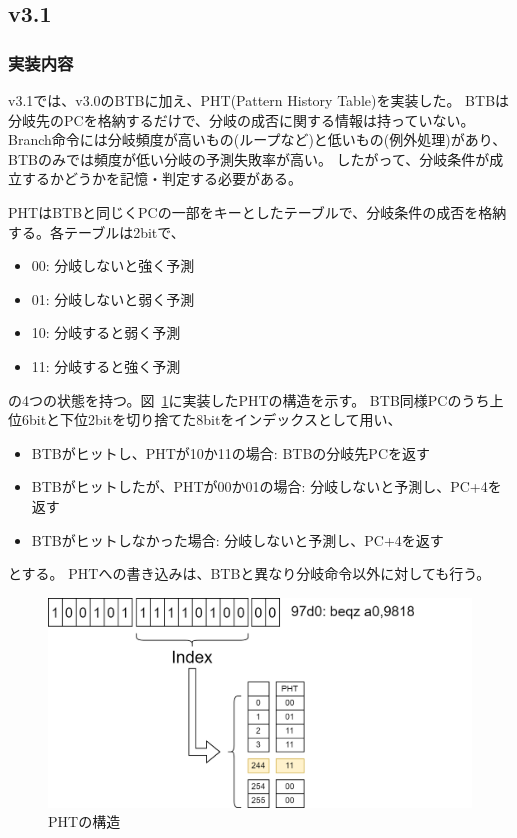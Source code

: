 \documentclass[dvipdfmx,10pt,a4paper,titlepage]{jsarticle}
\begin{document}
    \subsection{v3.1}
    \subsubsection{実装内容}
    v3.1では、v3.0のBTBに加え、PHT(Pattern History Table)を実装した。
    BTBは分岐先のPCを格納するだけで、分岐の成否に関する情報は持っていない。
    Branch命令には分岐頻度が高いもの(ループなど)と低いもの(例外処理)があり、BTBのみでは頻度が低い分岐の予測失敗率が高い。
    したがって、分岐条件が成立するかどうかを記憶・判定する必要がある。

    PHTはBTBと同じくPCの一部をキーとしたテーブルで、分岐条件の成否を格納する。各テーブルは2bitで、
    \begin{itemize}
        \item 00: 分岐しないと強く予測
        \item 01: 分岐しないと弱く予測
        \item 10: 分岐すると弱く予測
        \item 11: 分岐すると強く予測
    \end{itemize}
    の4つの状態を持つ。図~\ref{fig:pht}に実装したPHTの構造を示す。
    BTB同様PCのうち上位6bitと下位2bitを切り捨てた8bitをインデックスとして用い、
    \begin{itemize}
        \item BTBがヒットし、PHTが10か11の場合: BTBの分岐先PCを返す
        \item BTBがヒットしたが、PHTが00か01の場合: 分岐しないと予測し、PC+4を返す
        \item BTBがヒットしなかった場合: 分岐しないと予測し、PC+4を返す
    \end{itemize}
    とする。
    PHTへの書き込みは、BTBと異なり分岐命令以外に対しても行う。
    \begin{figure}[h]
        \centering
        \includegraphics[width=12cm]{figure/pht.png}
        \caption{PHTの構造}\label{fig:pht}
    \end{figure}
\end{document}
